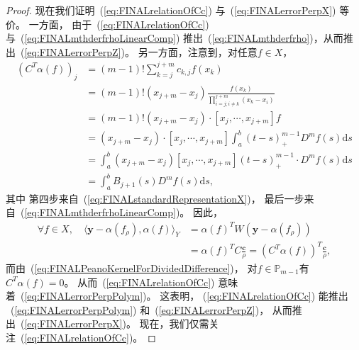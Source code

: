\begin{proof}
现在我们证明~(\ref{eq:FINALrelationOfCc}) 与~(\ref{eq:FINALerrorPerpX}) 等价。
一方面，
由于~(\ref{eq:FINALrelationOfCc}) 与~(\ref{eq:FINALmthderfrhoLinearComp})
推出~(\ref{eq:FINALmthderfrho})，从而推出~(\ref{eq:FINALerrorPerpZ})。
另一方面，注意到，对任意$f\in X$，
\begin{equation}
  \label{eq:FINALPeanoKernelForDividedDifference}
  \begin{aligned}
     (C^{T}\alpha(f))_{j}
    &= (m-1)!\sum_{k=j}^{j+m}c_{k,j}f(x_{k})\\
    &= (m-1)!(x_{j+m}-x_{j})
       \frac{f(x_{k})}{\prod_{i=j;i\neq k}^{j+m}(x_{k}-x_{i})}\\
   &= (m-1)!(x_{j+m}-x_{j})\cdot [x_{j},\cdots,x_{j+m}]f\\
    &= (x_{j+m}-x_{j})\cdot [x_{j},\cdots,x_{j+m}]
      \int_{a}^{b}(t-s)_{+}^{m-1}D^{m}f(s)\mathrm{d}s\\
    &= \int_{a}^{b}(x_{j+m}-x_{j})[x_{j},\cdots,x_{j+m}](t-s)_{+}^{m-1}
      \cdot D^{m}f(s)\mathrm{d}s\\
    &= \int_{a}^{b}B_{j+1}(s)D^{m}f(s)\mathrm{d}s,
  \end{aligned}
\end{equation}
其中
第四步来自~(\ref{eq:FINALstandardRepresentationX})，
最后一步来自~(\ref{eq:FINALmthderfrhoLinearComp})。
因此，
\begin{align*}
  \forall f\in X,\quad
  \langle \mathbf{y}-\alpha(f_{\rho}),\alpha(f) \rangle_{Y}
  &=\alpha(f)^{T}W(\mathbf{y}-\alpha(f_{\rho}))\\
  &=\alpha(f)^{T}C \frac{\mathbf{c}}{\rho}
  =(C^{T}\alpha(f))^{T}\frac{\mathbf{c}}{\rho},
\end{align*}
而由~(\ref{eq:FINALPeanoKernelForDividedDifference})，
对$f\in \mathbb{P}_{m-1}$有$C^{T}\alpha(f)=0$。
从而~(\ref{eq:FINALrelationOfCc}) 意味着~(\ref{eq:FINALerrorPerpPolym})。
这表明，
(\ref{eq:FINALrelationOfCc}) 能推出
~(\ref{eq:FINALerrorPerpPolym}) 和~(\ref{eq:FINALerrorPerpZ})，
从而推出~(\ref{eq:FINALerrorPerpX})。
现在，我们仅需关注~(\ref{eq:FINALrelationOfCc})。


\end{proof}
